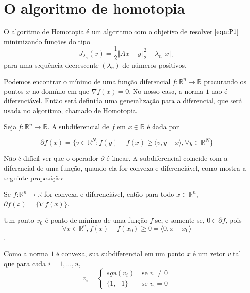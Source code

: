 \chapter{O algoritmo de homotopia}

O algoritmo de Homotopia  é um algoritmo com o objetivo de resolver $\eqref{eqn:P1}$ minimizando funções do tipo
$$J_{\lambda_n}(x) = \frac{1}{2} \Vert Ax - y \Vert_2^2 + \lambda_n \Vert x \Vert_1$$
para uma sequência decrescente $(\lambda_n)$ de números positivos.

Podemos encontrar o mínimo de uma função diferencial $f: \mathbb{R}^n \longrightarrow \mathbb{R}$ procurando os pontos $x$ no domínio em que $\nabla f(x) = 0$. No nosso caso, a norma $1$ não é diferenciável. Então será definida uma generalização para a diferencial, que será usada no algoritmo, chamado de Homotopia.

\begin{definicao}
Seja $f: \mathbb{R}^n \longrightarrow \mathbb{R}$. A subdiferencial de $f$ em $x \in \mathbb{R}$ é dada por

$$\partial f(x) = \{ v \in \mathbb{R}^N : f(y) - f(x) \geq \langle v, y - x \rangle, \forall y \in \mathbb{R}^N \}$$

\end{definicao}

Não é difícil ver que o operador $\partial$ é linear. A subdiferencial coincide com a diferencial de uma função, quando ela for convexa e diferenciável, como mostra a seguinte proposição:

\begin{proposicao}
Se $f: \mathbb{R}^n \longrightarrow \mathbb{R}$ for convexa e diferenciável, então para todo $x \in \mathbb{R}^n$, $\partial f(x) = \{ \nabla f(x) \}$.
\end{proposicao}

Um ponto $x_0$ é ponto de mínimo de uma função $f$ se, e somente se, $0 \in \partial f$, pois
$$ \forall x \in \mathbb{R}^n, f(x) - f(x_0) \geq 0 = \langle 0, x - x_0 \rangle$$.

Como a norma $1$ é convexa, sua subdiferencial em um ponto $x$ é um vetor $v$ tal que para cada $i = 1, \hdots, n$,
$$ v_i =
\begin{cases}
	sgn(v_i) & \mbox{ se } v_i \neq 0 \\
	\lbrace 1, -1\rbrace & \mbox{ se } v_i = 0
\end{cases}$$

